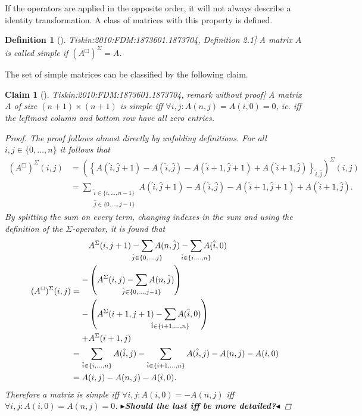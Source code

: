 \documentclass[twoside,11pt,openright]{report}
\newcommand{\todo}[1]{{\color[rgb]{.5,0,0}\textbf{$\blacktriangleright$#1$\blacktriangleleft$}}}
\newcommand{\reftiskin}[2]{\cite[#1]{Tiskin:2010:FDM:1873601.1873704}, #2}
\newtheorem{mydef}{Definition}
\newtheorem{claim}{Claim}
\begin{document}
If the operators are applied in the opposite order, it will not always describe a identity transformation. A class of matrices with this property is defined.
\begin{mydef}[\reftiskin{p. 1288}{Definition 2.1}]
  A matrix $A$ is called simple if $(A^{\Box})^\Sigma = A$.
\end{mydef}
The set of simple matrices can be classified by the following claim.
\begin{claim}[\reftiskin{p. 1288}{remark without proof}]
  \label{claim:simple-matrix-characterization}
  A matrix $A$ of size $(n + 1) \times (n + 1)$ is simple iff $\forall i,j: A(n, j) = A(i, 0) = 0$, ie. iff the leftmost column and bottom row have all zero entries.
  \begin{proof}
    The proof follows almost directly by unfolding definitions. For all $i, j \in \{ 0, \dots, n \}$ it follows that%
    \begin{align*}
      (A^{\Box})^{\Sigma}(i, j) &= \left( \left\{ A(\hat{i}, \hat{j} + 1) - A(\hat{i}, \hat{j}) - A(\hat{i} + 1, \hat{j} + 1) + A(\hat{i} + 1, \hat{j}) \right\}_{\hat{i}, \hat{j}} \right)^{\Sigma}(i, j) \\
        &= \sum_{\substack{\hat{i} \in \{i, \dots, n - 1\} \\ \hat{j} \in \{0, \dots, j - 1\}}} { A(\hat{i}, \hat{j} + 1) - A(\hat{i}, \hat{j}) - A(\hat{i} + 1, \hat{j} + 1) + A(\hat{i} + 1, \hat{j}) } .
    \end{align*}%
    By splitting the sum on every term, changing indexes in the sum and using the definition of the $\Sigma$-operator, it is found that
    \begin{align*}
      (A^{\Box})^{\Sigma}(i, j) &=
        \begin{aligned}
          &A^{\Sigma}(i, j + 1) - \sum_{\mathclap{\hat{j} \in \{0, \dots, j\}}} A(n, \hat{j}) - \sum_{\mathclap{\hat{i} \in \{i, \dots, n\}}} {A(\hat{i}, 0)} \\
          - &\left( A^{\Sigma}(i, j) - \sum_{\mathclap{\hat{j} \in \{0, \dots, j - 1\}}} A(n, \hat{j}) \right) \\
          - &\left( A^{\Sigma}(i + 1, j + 1) - \sum_{\mathclap{\hat{i} \in \{i + 1, \dots, n\}}} A(\hat{i}, 0) \right) \\
          + &A^{\Sigma}(i + 1, j)
        \end{aligned} \\
        &= \sum_{\hat{i} \in \{i, \dots, n\}} A(\hat{i}, j) - \sum_{\hat{i} \in \{i + 1, \dots, n\}} A(\hat{i}, j) - A(n, j) - A(i, 0) \\
        &= A(i, j) - A(n, j) - A(i, 0).
    \end{align*}
    Therefore a matrix is simple iff $\forall i, j: A(i, 0) = -A(n, j)$ iff $\forall i, j: A(i, 0) = A(n, j) = 0$.
    \todo{Should the last iff be more detailed?}
  \end{proof}
\end{claim}
\end{document}
